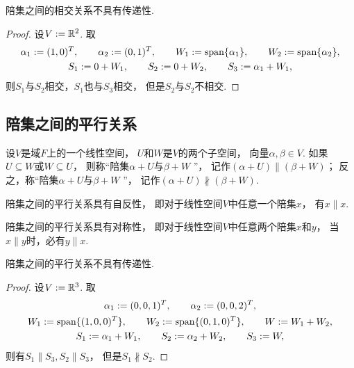 \begin{property}
陪集之间的相交关系不具有传递性.
\begin{proof}
设\(V := \mathbb{R}^2\).
取\begin{gather*}
	\alpha_1 := (1,0)^T,
	\qquad
	\alpha_2 := (0,1)^T,
	\qquad
	W_1 := \operatorname{span}\{\alpha_1\},
	\qquad
	W_2 := \operatorname{span}\{\alpha_2\}, \\
	S_1 := 0 + W_1,
	\qquad
	S_2 := 0 + W_2,
	\qquad
	S_3 := \alpha_1 + W_1,
\end{gather*}
则\(S_1\)与\(S_2\)相交，\(S_1\)也与\(S_3\)相交，
但是\(S_2\)与\(S_2\)不相交.
\end{proof}
\end{property}

\subsection{陪集之间的平行关系}
\begin{definition}
设\(V\)是域\(F\)上的一个线性空间，
\(U\)和\(W\)是\(V\)的两个子空间，
向量\(\alpha,\beta \in V\).
如果\(U \subseteq W\)或\(W \subseteq U\)，
则称“陪集\(\alpha + U\)与\(\beta + W\) ”，
记作\((\alpha + U) \parallel (\beta + W)\)；
反之，称“陪集\(\alpha + U\)与\(\beta + W\) ”，
记作\((\alpha + U) \nparallel (\beta + W)\).
\end{definition}

\begin{property}
陪集之间的平行关系具有自反性，
即对于线性空间\(V\)中任意一个陪集\(x\)，
有\(x \parallel x\).
\end{property}

\begin{property}
陪集之间的平行关系具有对称性，
即对于线性空间\(V\)中任意两个陪集\(x\)和\(y\)，
当\(x \parallel y\)时，必有\(y \parallel x\).
\end{property}

\begin{property}
陪集之间的平行关系不具有传递性.
\begin{proof}
设\(V := \mathbb{R}^3\).
取\begin{gather*}
	\alpha_1 := (0,0,1)^T,
	\qquad
	\alpha_2 := (0,0,2)^T, \\
	W_1 := \operatorname{span}\{(1,0,0)^T\},
	\qquad
	W_2 := \operatorname{span}\{(0,1,0)^T\},
	\qquad
	W := W_1 + W_2, \\
	S_1 := \alpha_1 + W_1,
	\qquad
	S_2 := \alpha_2 + W_2,
	\qquad
	S_3 := W,
\end{gather*}
则有\(
	S_1 \parallel S_3,
	S_2 \parallel S_3
\)，
但是\(S_1 \nparallel S_2\).
\end{proof}
\end{property}

